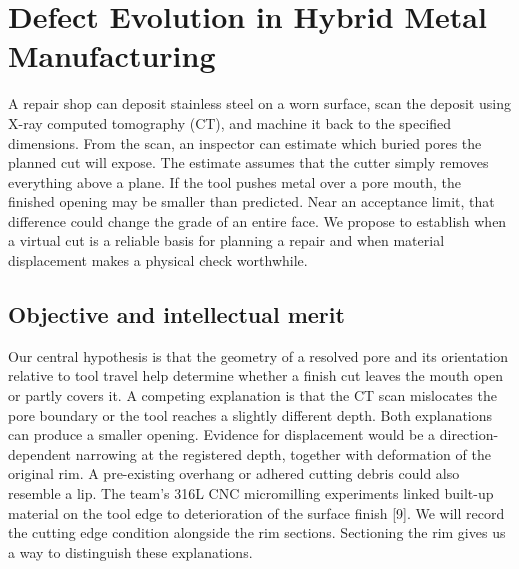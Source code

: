 \documentclass[11pt,letterpaper]{article}
\begin{document}
\section*{Defect Evolution in Hybrid Metal Manufacturing}

A repair shop can deposit stainless steel on a worn surface, scan the deposit using X-ray computed tomography (CT), and machine it back to the specified dimensions. From the scan, an inspector can estimate which buried pores the planned cut will expose. The estimate assumes that the cutter simply removes everything above a plane. If the tool pushes metal over a pore mouth, the finished opening may be smaller than predicted. Near an acceptance limit, that difference could change the grade of an entire face. We propose to establish when a virtual cut is a reliable basis for planning a repair and when material displacement makes a physical check worthwhile.

\subsection*{Objective and intellectual merit}

Our central hypothesis is that the geometry of a resolved pore and its orientation relative to tool travel help determine whether a finish cut leaves the mouth open or partly covers it. A competing explanation is that the CT scan mislocates the pore boundary or the tool reaches a slightly different depth. Both explanations can produce a smaller opening. Evidence for displacement would be a direction-dependent narrowing at the registered depth, together with deformation of the original rim. A pre-existing overhang or adhered cutting debris could also resemble a lip. The team’s 316L CNC micromilling experiments linked built-up material on the tool edge to deterioration of the surface finish [9]. We will record the cutting edge condition alongside the rim sections. Sectioning the rim gives us a way to distinguish these explanations.
\end{document}
